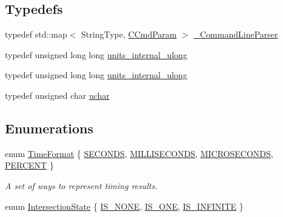 \subsection*{Typedefs}
\begin{CompactItemize}
\item 
typedef std::map$<$ String\-Type, \hyperlink{struct_j_g_t_l_1_1_c_cmd_param}{CCmd\-Param} $>$ \hyperlink{namespace_j_g_t_l_93797b96f684075b65783b93d11f2f1d}{\_\-Command\-Line\-Parser}
\item 
typedef unsigned long long \hyperlink{namespace_j_g_t_l_1924d6fd42e2d9661bc0b5a5063b99b3}{units\_\-internal\_\-ulong}
\item 
typedef unsigned long long \hyperlink{namespace_j_g_t_l_1924d6fd42e2d9661bc0b5a5063b99b3}{units\_\-internal\_\-ulong}
\item 
typedef unsigned char \hyperlink{namespace_j_g_t_l_16d84383f2c4546df4385d012e588239}{uchar}
\end{CompactItemize}
\subsection*{Enumerations}
\begin{CompactItemize}
\item 
enum \hyperlink{namespace_j_g_t_l_11a34d88ecadd1c99354adc21fd5abe6}{Time\-Format} \{ \hyperlink{namespace_j_g_t_l_11a34d88ecadd1c99354adc21fd5abe6ad29f96ec6ca22f686db310d3e491ccd}{SECONDS}, 
\hyperlink{namespace_j_g_t_l_11a34d88ecadd1c99354adc21fd5abe60634056587e1e00ecaa18019a990c055}{MILLISECONDS}, 
\hyperlink{namespace_j_g_t_l_11a34d88ecadd1c99354adc21fd5abe68e2289b823ea3baf8aa44b51676d3b08}{MICROSECONDS}, 
\hyperlink{namespace_j_g_t_l_11a34d88ecadd1c99354adc21fd5abe6a5f6364e2e978c03f8500a982568cad7}{PERCENT}
 \}
\begin{CompactList}\small\item\em A set of ways to represent timing results. \item\end{CompactList}\item 
enum \hyperlink{namespace_j_g_t_l_84ea7d7d885581de216d16c16850615a}{Intersection\-State} \{ \hyperlink{namespace_j_g_t_l_84ea7d7d885581de216d16c16850615a369e807c8fd7ae8e195ac1c08eba4bc6}{IS\_\-NONE}, 
\hyperlink{namespace_j_g_t_l_84ea7d7d885581de216d16c16850615ab6007d6481aaf6eec2f7d24242e7f1b9}{IS\_\-ONE}, 
\hyperlink{namespace_j_g_t_l_84ea7d7d885581de216d16c16850615a5a453a0eb6cf98fc847442dd4bbafe51}{IS\_\-INFINITE}
 \}
\end{CompactItemize}
